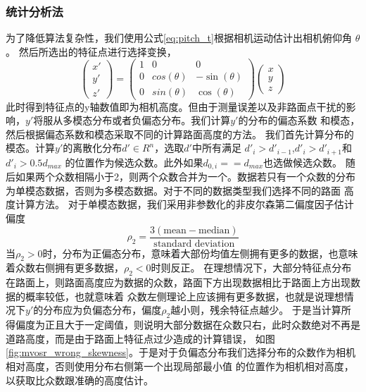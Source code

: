 \subsubsection{统计分析法}
为了降低算法复杂性，我们使用公式\ref{eq:pitch_t}根据相机运动估计出相机俯仰角
$\theta$。
然后所选出的特征点进行选择变换，
\begin{equation}
    \begin{pmatrix} x'\\y'\\z'\end{pmatrix} = 
 \begin{pmatrix}
  1&0&0 \\
  0&cos(\theta)&-\sin(\theta)\\
  0&sin(\theta)&\cos(\theta)
 \end{pmatrix}
 \begin{pmatrix}x\\y\\z
\end{pmatrix}
\label{eq:feture_remap}
\end{equation}
此时得到特征点的y轴数值即为相机高度。但由于测量误差以及非路面点干扰的影响，$y'$将服从多模态分布或者负偏态分布。我们计算$y'$的分布的偏态系数
和模态，然后根据偏态系数和模态采取不同的计算路面高度的方法。
我们首先计算分布的模态。计算$y'$的离散化分布$d'\in R^n$，选取$d'$中所有满足
$d'_i>d'_{i-1}$,$ d'_i>d'_{i+1} $和$ d'_i>0.5d_{max}$ 的位置作为候选众数。此外如果$d_{0,i} ==d_{max}$也选做候选众数。
随后如果两个众数相隔小于2，则两个众数合并为一个。数据若只有一个众数的分布为单模态数据，否则为多模态数据。对于不同的数据类型我们选择不同的路面
高度计算方法。
对于单模态数据，我们采用非参数化的非皮尔森第二偏度因子估计偏度
\begin{equation}
    \rho_2 = \frac{3(\text{mean}-\text{median})}{\text{standard deviation}}
\end{equation}
当$\rho_2>0$时，分布为正偏态分布，意味着大部份均值左侧拥有更多的数据，也意味着众数右侧拥有更多数据，$\rho_2<0$时则反正。
在理想情况下，大部分特征点分布在路面上，则路面高度应为数据的众数，路面下方出现数据相比于路面上方出现数据的概率较低，也就意味着
众数左侧理论上应该拥有更多数据，也就是说理想情况下$y'$的分布应为负偏态分布，偏度$\rho_2$越小则，残余特征点越少。
于是当计算所得偏度为正且大于一定阈值，则说明大部分数据在众数只右，此时众数绝对不再是道路高度，而是由于路面上特征点过少造成的计算错误，
如图 \ref{fig:mvosr_wrong_skewness}。于是对于负偏态分布我们选择分布的众数作为相机相对高度，否则使用分布右侧第一个出现局部最小值
的位置作为相机相对高度，以获取比众数跟准确的高度估计。

